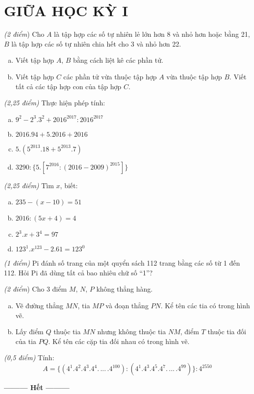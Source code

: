 \section{GIỮA HỌC KỲ I}
\setcounter{ex}{0}
\begin{ex}  \textit{(2 điểm}) Cho $A$ là tập hợp các số tự nhiên lẻ lớn hơn 8 và nhỏ hơn hoặc bằng 21, $B$ là tập hợp các số tự nhiên chia hết cho 3 và nhỏ hơn 22.
\begin{enumerate} [a)]
\item Viết tập hợp $A$, $B$ bằng cách liệt kê các phần tử.
\item Viết tập hợp $C$ các phần tử vừa thuộc tập hợp $A$ vừa thuộc tập hợp $B$. Viết tất cả các tập hợp con của tập hợp $C$.
\end{enumerate}	
\end{ex}    \begin{ex}  \textit{(2,25 điểm)} Thực hiện phép tính:
\begin{enumerate} [a)]
\item ${9^2} - {2^3}{.3^2} + {2016^{2017}}:{2016^{2017}}$
\item $2016.94 + 5.2016 + 2016$
\item $5.({5^{2013}}.18 + {5^{2013}}.7)$
\item $3290:\{ 5.[{7^{2016}}:{(2016 - 2009)^{2015}}]\}$
\end{enumerate}
\end{ex}    \begin{ex} \textit{(2,25 điểm)} Tìm $x$, biết:
\begin{multicols}{2}
\begin{enumerate}[a)]
\item $235 - (x - 10) = 51$
\item $2016:(5x + 4) = 4$
\item ${2^3}.x + {3^4} = 97$
\item ${123^1}.{x^{123}} - 2.61 = {123^0}$
\end{enumerate} 
\end{multicols}
\noindent \end{ex}    \begin{ex}  \textit{(1 điểm)} Pi đánh số trang của một quyển sách 112 trang bằng các số từ 1 đến 112. Hỏi Pi đã dùng tất cả bao nhiêu chữ số “1”?\\
\end{ex}    \begin{ex}  \textit{(2 điểm}) Cho 3 điểm $M$, $N$, $P$ không thẳng hàng. 
\begin{enumerate}[a)]
\item Vẽ đường thẳng $MN$, tia $MP$ và đoạn thẳng $PN$. Kể tên các tia có trong hình vẽ.
\item Lấy điểm $Q$ thuộc tia $MN$ nhưng không thuộc tia $NM$, điểm $T$ thuộc tia đối của tia $PQ$. Kể tên các cặp tia đối nhau có trong hình vẽ.
\end{enumerate}
\end{ex}    \begin{ex} \textit{(0,5 điểm)} Tính:
\[A = \{ ({4^1}{.4^2}{.4^3}{.4^4}.\,...\,{.4^{100}}):({4^1}{.4^3}{.4^5}{.4^7}.\,...\,{.4^{99}})\} :{4^{2550}}\]
\end{ex}
\begin{center}
\textbf{\textbf{---------} Hết \textbf{---------}}
\end{center}